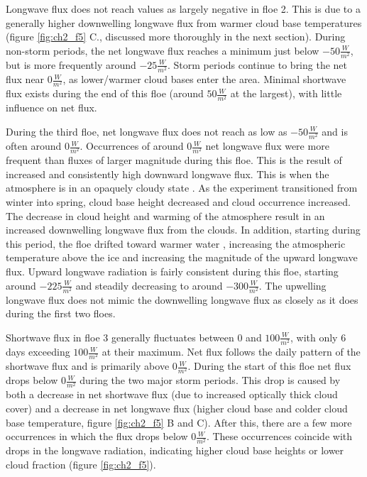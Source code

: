 Longwave flux does not reach values as largely negative in floe 2. This is due to a generally higher downwelling longwave flux from warmer cloud base temperatures (figure \ref{fig:ch2_f5} C., discussed more thoroughly in the next section). During non-storm periods, the net longwave flux reaches a minimum just below $-50 \frac{W}{m^{2}}$, but is more frequently around $-25 \frac{W}{m^{2}}$. Storm periods continue to bring the net flux near $0 \frac{W}{m^{2}}$, as lower/warmer cloud bases enter the area. Minimal shortwave flux exists during the end of this floe (around $50 \frac{W}{m^{2}}$ at the largest), with little influence on net flux.

During the third floe, net longwave flux does not reach as low as $-50 \frac{W}{m^{2}}$ and is often around $0 \frac{W}{m^{2}}$. Occurrences of around $0 \frac{W}{m^{2}}$ net longwave flux were more frequent than fluxes of larger magnitude during this floe. This is the result of increased and consistently high downward longwave flux. This is when the atmosphere is in an opaquely cloudy state \cite{stramler:, graham:2017}. As the experiment transitioned from winter into spring, cloud base height decreased and cloud occurrence increased. The decrease in cloud height and warming of the atmosphere result in an increased downwelling longwave flux from the clouds. In addition, starting during this period, the floe drifted toward warmer water \cite{kayser:2017}, increasing the atmospheric temperature above the ice and increasing the magnitude of the upward longwave flux. Upward longwave radiation is fairly consistent during this floe, starting around $-225 \frac{W}{m^{2}}$ and steadily decreasing to around $-300 \frac{W}{m^{2}}$. The upwelling longwave flux does not mimic the downwelling longwave flux as closely as it does during the first two floes.

Shortwave flux in floe 3 generally fluctuates between $0$ and $100 \frac{W}{m^{2}}$, with only 6 days exceeding $100 \frac{W}{m^{2}}$ at their maximum. Net flux follows the daily pattern of the shortwave flux and is primarily above $0 \frac{W}{m^{2}}$. During the start of this floe net flux drops below $0 \frac{W}{m^{2}}$ during the two major storm periods. This drop is caused by both a decrease in net shortwave flux (due to increased optically thick cloud cover) and a decrease in net longwave flux (higher cloud base and colder cloud base temperature, figure \ref{fig:ch2_f5} B and C). After this, there are a few more occurrences in which the flux drops below $0 \frac{W}{m^{2}}$. These occurrences coincide with drops in the longwave radiation, indicating higher cloud base heights or lower cloud fraction (figure \ref{fig:ch2_f5}).  

